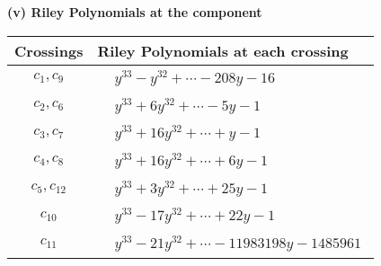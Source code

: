 \documentclass[1p]{elsarticle_modified}
\theoremstyle{definition}
\begin{document}
\newpage\renewcommand{\arraystretch}{1}
\flushleft \textbf{(v) Riley Polynomials at the component}\newline \\
\begin{tabular}{m{50pt}|m{274pt}}
Crossings & \hspace{64pt}Riley Polynomials at each crossing \\
\hline $$\begin{aligned}c_{1},c_{9}\end{aligned}$$&$\begin{aligned}
&y^{33}- y^{32}+\cdots-208 y-16
\end{aligned}$\\
\hline $$\begin{aligned}c_{2},c_{6}\end{aligned}$$&$\begin{aligned}
&y^{33}+6 y^{32}+\cdots-5 y-1
\end{aligned}$\\
\hline $$\begin{aligned}c_{3},c_{7}\end{aligned}$$&$\begin{aligned}
&y^{33}+16 y^{32}+\cdots+y-1
\end{aligned}$\\
\hline $$\begin{aligned}c_{4},c_{8}\end{aligned}$$&$\begin{aligned}
&y^{33}+16 y^{32}+\cdots+6 y-1
\end{aligned}$\\
\hline $$\begin{aligned}c_{5},c_{12}\end{aligned}$$&$\begin{aligned}
&y^{33}+3 y^{32}+\cdots+25 y-1
\end{aligned}$\\
\hline $$\begin{aligned}c_{10}\end{aligned}$$&$\begin{aligned}
&y^{33}-17 y^{32}+\cdots+22 y-1
\end{aligned}$\\
\hline $$\begin{aligned}c_{11}\end{aligned}$$&$\begin{aligned}
&y^{33}-21 y^{32}+\cdots-11983198 y-1485961
\end{aligned}$\\
\hline
\end{tabular}\\~\\
\end{document}
